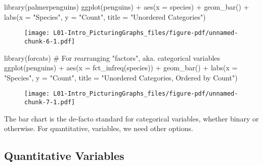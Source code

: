 \documentclass[
  letterpaper,
  DIV=11,
  numbers=noendperiod]{scrreprt}
\newenvironment{Shaded}{\begin{snugshade}}{\end{snugshade}}
\newcommand{\AttributeTok}[1]{\textcolor[rgb]{0.40,0.45,0.13}{#1}}
\newcommand{\CommentTok}[1]{\textcolor[rgb]{0.37,0.37,0.37}{#1}}
\newcommand{\FunctionTok}[1]{\textcolor[rgb]{0.28,0.35,0.67}{#1}}
\newcommand{\NormalTok}[1]{\textcolor[rgb]{0.00,0.23,0.31}{#1}}
\newcommand{\SpecialCharTok}[1]{\textcolor[rgb]{0.37,0.37,0.37}{#1}}
\newcommand{\StringTok}[1]{\textcolor[rgb]{0.13,0.47,0.30}{#1}}
\begin{document}
\begin{Shaded}
\begin{Highlighting}[]
\FunctionTok{library}\NormalTok{(palmerpenguins)}
\FunctionTok{ggplot}\NormalTok{(penguins) }\SpecialCharTok{+}
    \FunctionTok{aes}\NormalTok{(}\AttributeTok{x =}\NormalTok{ species) }\SpecialCharTok{+}
    \FunctionTok{geom\_bar}\NormalTok{() }\SpecialCharTok{+}
    \FunctionTok{labs}\NormalTok{(}\AttributeTok{x =} \StringTok{"Species"}\NormalTok{, }\AttributeTok{y =} \StringTok{"Count"}\NormalTok{,}
        \AttributeTok{title =} \StringTok{"Unordered Categories"}\NormalTok{)}
\end{Highlighting}
\end{Shaded}

\begin{figure}[H]

{\centering \texttt{[image: L01-Intro\_PicturingGraphs\_files/figure-pdf/unnamed-chunk-6-1.pdf]}

}

\end{figure}

\begin{Shaded}
\begin{Highlighting}[]
\FunctionTok{library}\NormalTok{(forcats) }\CommentTok{\# For rearranging "factors", aka. categorical variables}
\FunctionTok{ggplot}\NormalTok{(penguins) }\SpecialCharTok{+}
    \FunctionTok{aes}\NormalTok{(}\AttributeTok{x =} \FunctionTok{fct\_infreq}\NormalTok{(species)) }\SpecialCharTok{+}
    \FunctionTok{geom\_bar}\NormalTok{() }\SpecialCharTok{+}
    \FunctionTok{labs}\NormalTok{(}\AttributeTok{x =} \StringTok{"Species"}\NormalTok{, }\AttributeTok{y =} \StringTok{"Count"}\NormalTok{,}
        \AttributeTok{title =} \StringTok{"Unordered Categories, Ordered by Count"}\NormalTok{)}
\end{Highlighting}
\end{Shaded}

\begin{figure}[H]

{\centering \texttt{[image: L01-Intro\_PicturingGraphs\_files/figure-pdf/unnamed-chunk-7-1.pdf]}

}

\end{figure}

The bar chart is the de-facto standard for categorical variables,
whether binary or otherwise. For quantitative, variables, we need other
options.

\hypertarget{quantitative-variables}{%
\subsection{Quantitative Variables}\label{quantitative-variables}}
\end{document}
